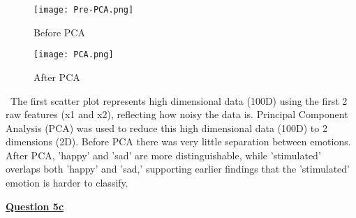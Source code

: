\documentclass[12pt]{article}
\begin{document}
\begin{figure}[H]
\centering
\begin{minipage}[t]{0.48\textwidth}
    \centering
    \texttt{[image: Pre-PCA.png]}
    \caption{Before PCA}
    \label{fig:pre-pca}
\end{minipage}
\hfill
\begin{minipage}[t]{0.48\textwidth}
    \centering
    \texttt{[image: PCA.png]}
    \caption{After PCA}
    \label{fig:post-pca}
\end{minipage}
\end{figure}
\text\noindent\ The first scatter plot represents high dimensional data (100D) using the first 2 raw features (x1 and x2), reflecting how noisy the data is. Principal Component Analysis (PCA) was used to reduce this high dimensional data (100D) to 2 dimensions (2D). 
\text Before PCA there was very little separation between emotions. After PCA, 'happy' and 'sad' are more distinguishable, while 'stimulated' overlaps both 'happy' and 'sad,' supporting earlier findings that the 'stimulated' emotion is harder to classify. 

\vspace{1em}
\noindent\textbf{\underline{Question 5c}}\par
\end{document}
